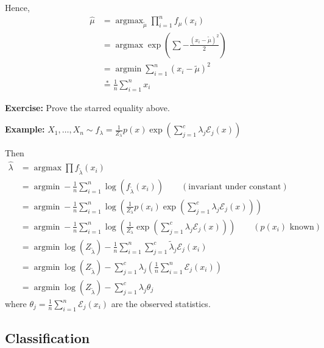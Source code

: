 \documentclass[12pt]{report}
\renewcommand{\hat}[1]{\widehat{#1}}
\newcommand{\Ec}{\mathcal{E}}
\newcommand*{\tbf}[1]{\ifmmode\mathbf{#1}\else\textbf{#1}\fi}
\DeclareMathOperator*{\argmax}{\arg\max}
\DeclareMathOperator*{\argmin}{\arg\min}
\newenvironment*{exercise}[1][red]{
    \begin{tcolorbox}[
        parbox=false,
        colback=#1!5!white,
        colframe=#1!75!black,
        breakable
    ]}
    {\end{tcolorbox}}
\begin{document}
Hence,
\begin{align*}
	\hat \mu & = \argmax_{\tilde \mu} \prod_{i=1}^n f_{\mu}(x_i)               \\
	         & = \argmax \exp\left(\sum -\frac{(x_i - \tilde \mu)^2}{2}\right) \\
	         & = \argmin \sum_{i=1}^n (x_i - \tilde \mu)^2                     \\
	         & \overset{*}{=} \frac{1}{n} \sum_{i=1}^n x_i
\end{align*}

\begin{exercise}
	\textbf{Exercise:} Prove the starred equality above.
\end{exercise}

\tbf{Example:} $X_1, \dots, X_n \sim f_{\lambda} = \frac{1}{Z_{\lambda}} p(x) \exp\left(\sum_{j=1}^c \lambda_j \Ec_j(x)\right) $

Then
\begin{align*}
	\hat \lambda & = \argmax \prod f_{\tilde \lambda} (x_i)                                                                                                                    \\
	             & = \argmin -\frac{1}{n} \sum_{i=1}^{n} \log(f_{\tilde \lambda}(x_i)) \qquad (\text{invariant under constant})                                                \\
	             & = \argmin -\frac{1}{n} \sum_{i=1}^{n} \log\left(\frac{1}{Z_{\lambda}} p(x_i) \exp\left(\sum_{j=1}^c \lambda_j \Ec_j(x)\right)\right)                        \\
	             & = \argmin -\frac{1}{n} \sum_{i=1}^{n} \log\left(\frac{1}{Z_{\lambda}} \exp\left(\sum_{j=1}^c \lambda_j \Ec_j(x)\right)\right) \qquad (p(x_i) \text{ known}) \\
	             & = \argmin \log(Z_{\tilde \lambda}) - \frac{1}{n} \sum_{i=1}^n \sum_{j=1}^{c} \tilde \lambda_j \Ec_j(x_i)                                                    \\
	             & = \argmin \log(Z_{\tilde \lambda}) - \sum_{j=1}^{c} \lambda_j \left(\frac{1}{n} \sum_{i=1}^n \Ec_j(x_i)\right)                                              \\
	             & = \argmin \log(Z_{\tilde \lambda}) - \sum_{j=1}^{c} \lambda_j \theta_j
\end{align*}
where $\theta_j = \frac{1}{n} \sum_{i=1}^n \Ec_j(x_i)$ are the observed statistics.

\subsection{Classification}
\end{document}
